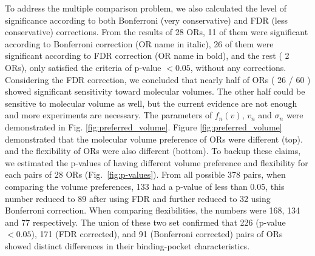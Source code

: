 \documentclass[11pt]{paper} %
\newcommand{\numberofreceptors}{ 28 }
\newcommand{\bonferroni}{ 11 }
\newcommand{\fdr}{ 26 }
\newcommand{\nocorrection}{ 2 }
\begin{document}
To address the multiple comparison problem, 
we also calculated the level of significance according to both Bonferroni (very conservative) and FDR (less conservative) corrections. 
From the results of \numberofreceptors ORs, 
\bonferroni of them were significant according to Bonferroni correction (OR name in italic), 
\fdr of them were significant according to FDR correction 
(OR name in bold), 
and the rest (\nocorrection ORs), 
only satisfied the criteria of  p-value $<0.05$, without any corrections.
Considering the FDR correction, 
we concluded that nearly half of ORs (\fdr / 60 ) showed significant sensitivity toward molecular volumes. 
The other half could be sensitive to molecular volume as well, but the current evidence are not enough and
more experiments are necessary.
The parameters of $f_n(v)$, $v_n$ and $\sigma_n$ were demonstrated in Fig. \ref{fig:preferred_volume}.
Figure \ref{fig:preferred_volume} demonstrated that the molecular volume preference of ORs were different (top). 
and the flexibility of ORs were also different (bottom).
To backup these claims, 
we estimated the p-values of having different volume preference and flexibility for each pairs of \numberofreceptors ORs
(Fig.~\ref{fig:p-values}). 
From all possible 378 pairs, 
when comparing the volume preferences, 
133 had a p-value of less than 0.05, 
this number reduced to 89 after using FDR and further reduced to 32 using Bonferroni correction.
When comparing flexibilities, 
the numbers were 168, 134 and 77 respectively. 
The union of these two set confirmed that 226 (p-value $<0.05$), 171 (FDR corrected), and 91 (Bonferroni corrected) pairs of ORs showed distinct differences in their binding-pocket characteristics.
\end{document}
